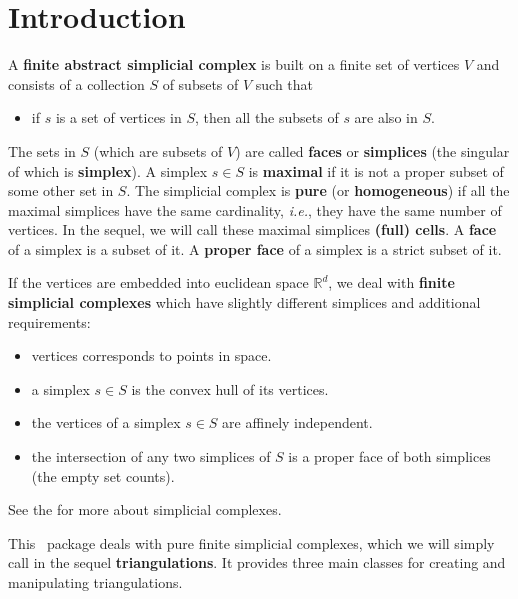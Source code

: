 
\newcommand{\note}[1]{\begin{ccTexOnly}%
{\color{red}$\langle\!\langle$#1$\rangle\!\rangle$}\end{ccTexOnly}}
\newcommand{\sphere}{\ensuremath{\mathcal S}}
\renewcommand{\real}{\ensuremath{\mathbb R}}

\section{Introduction\label{triangulation:intro}}

A \textbf{finite abstract simplicial complex} is built on a finite set of
vertices $V$ and consists of a collection $S$ of subsets of $V$ such that
\begin{itemize}
\item if $s$ is a set of vertices in $S$, then all the subsets of $s$ are also
in $S$.
\end{itemize}

The sets in $S$ (which are subsets of $V$) are called
\textbf{faces} or \textbf{simplices} (the
singular of which is \textbf{simplex}).
%
A simplex $s\in S$ is \textbf{maximal} if it is not a proper subset of some other
set in $S$. The simplicial complex is \textbf{pure} (or \textbf{homogeneous})
if all the maximal simplices have the same cardinality, \emph{i.e.}, they have the same
number of vertices. 
In the sequel, we will call these maximal simplices \textbf{(full) cells}.
A \textbf{face} of a simplex is a subset of it.
A \textbf{proper face} of a simplex is a strict subset of it.

If the vertices are embedded into euclidean space $\real^d$, we deal with
\textbf{finite simplicial complexes} which have slightly different simplices
and additional requirements:
\begin{itemize}
\item vertices corresponds to points in space.
\item a simplex $s\in S$ is the convex hull of its vertices.
\item the vertices of a simplex $s\in S$ are affinely independent.
\item the intersection of any two simplices of $S$ is a proper face of both
simplices (the empty set counts).
\end{itemize}
See the  for more about simplicial complexes.

This \cgal\ package deals with pure finite simplicial complexes, which
we will simply call in the sequel \textbf{triangulations}. It provides three main classes
for creating and manipulating triangulations.

